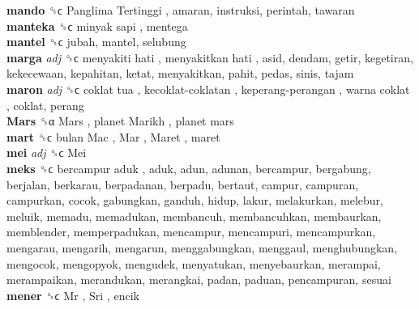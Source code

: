 \textbf{mando} ␝ϲ   Panglima Tertinggi , amaran, instruksi, perintah, tawaran  \\
\textbf{manteka} ␝ϲ   minyak sapi , mentega  \\
\textbf{mantel} ␝ϲ  jubah, mantel, selubung  \\
\textbf{marga} \emph{adj}  ␝ϲ   menyakiti hati ,  menyakitkan hati , asid, dendam, getir, kegetiran, kekecewaan, kepahitan, ketat, menyakitkan, pahit, pedas, sinis, tajam  \\
\textbf{maron} \emph{adj}  ␝ϲ   coklat tua ,  kecoklat-coklatan ,  keperang-perangan ,  warna coklat , coklat, perang  \\
\textbf{Mars} ␝α   Mars ,  planet Marikh ,  planet mars   \\
\textbf{mart} ␝ϲ   bulan Mac ,  Mar ,  Maret , maret  \\
\textbf{mei} \emph{adj}  ␝ϲ   Mei   \\
\textbf{meks} ␝ϲ   bercampur aduk , aduk, adun, adunan, bercampur, bergabung, berjalan, berkarau, berpadanan, berpadu, bertaut, campur, campuran, campurkan, cocok, gabungkan, ganduh, hidup, lakur, melakurkan, melebur, meluik, memadu, memadukan, membancuh, membancuhkan, membaurkan, memblender, memperpadukan, mencampur, mencampuri, mencampurkan, mengarau, mengarih, mengarun, menggabungkan, menggaul, menghubungkan, mengocok, mengopyok, mengudek, menyatukan, menyebaurkan, merampai, merampaikan, merandukan, merangkai, padan, paduan, pencampuran, sesuai  \\
\textbf{mener} ␝ϲ   Mr ,  Sri , encik  \\
